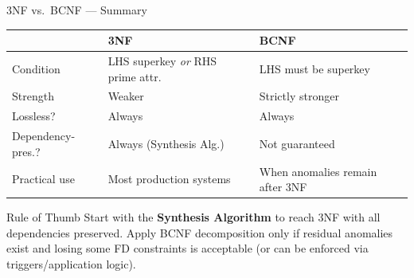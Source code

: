 \begin{frame}{3NF vs.\ BCNF --- Summary}
  \begin{center}
    \small
    \begin{tabular}{lll}
      \toprule
      & \textbf{3NF} & \textbf{BCNF} \\
      \midrule
      Condition         & LHS superkey \emph{or} RHS prime attr. & LHS must be superkey \\
      Strength          & Weaker                                  & Strictly stronger \\
      Lossless?         & Always                                  & Always \\
      Dependency-pres.? & Always (Synthesis Alg.)                 & Not guaranteed \\
      Practical use     & Most production systems                 & When anomalies remain after 3NF \\
      \bottomrule
    \end{tabular}
  \end{center}

  \vspace{0.5em}
  \begin{block}{Rule of Thumb}
    Start with the \textbf{Synthesis Algorithm} to reach 3NF with all
    dependencies preserved.  Apply BCNF decomposition only if residual anomalies
    exist and losing some FD constraints is acceptable (or can be enforced via
    triggers/application logic).
  \end{block}
\end{frame}

